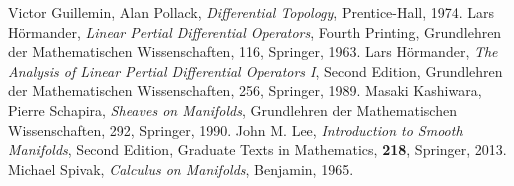 \begin{thebibliography}{20} 
     Victor Guillemin, Alan Pollack, 
    \textit{Differential Topology}, 
    Prentice-Hall, 1974.
     Lars H\"ormander, 
    \textit{Linear Pertial Differential Operators}, Fourth Printing, 
    Grundlehren der Mathematischen Wissenschaften, 116, Springer, 1963.
     Lars H\"ormander, 
    \textit{The Analysis of Linear Pertial Differential Operators I}, Second Edition,
    Grundlehren der Mathematischen Wissenschaften, 256, Springer, 1989.
     Masaki Kashiwara, Pierre Schapira, 
    \textit{Sheaves on Manifolds}, 
    Grundlehren der Mathematischen Wissenschaften, 292, Springer, 1990.
     John M. Lee, 
    \textit{Introduction to Smooth Manifolds}, Second Edition,
    Graduate Texts in Mathematics, \textbf{218}, Springer, 2013.
     Michael Spivak, 
    \textit{Calculus on Manifolds}, 
    Benjamin, 1965.
\end{thebibliography}




